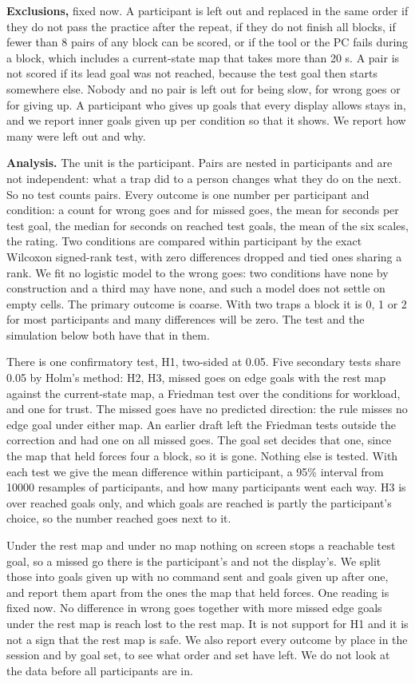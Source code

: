 \documentclass[pdflatex,sn-mathphys-num]{sn-jnl}
\begin{document}
\textbf{Exclusions,} fixed now. A participant is left out and replaced in the same order if they do not pass the
practice after the repeat, if they do not finish all blocks, if fewer than 8 pairs of any block can be scored, or
if the tool or the PC fails during a block, which includes a current-state map that takes more than 20 s. A pair
is not scored if its lead goal was not reached, because the test goal then starts somewhere else. Nobody and no
pair is left out for being slow, for wrong goes or for giving up. A participant who gives up goals that every
display allows stays in, and we report inner goals given up per condition so that it shows. We report how many
were left out and why.

\textbf{Analysis.} The unit is the participant. Pairs are nested in participants and are not independent: what a
trap did to a person changes what they do on the next. So no test counts pairs. Every outcome is one number per
participant and condition: a count for wrong goes and for missed goes, the mean for seconds per test goal, the
median for seconds on reached test goals, the mean of the six scales, the rating. Two conditions are compared
within participant by the exact Wilcoxon signed-rank test, with zero differences dropped and tied ones sharing a
rank. We fit no logistic model to the wrong goes: two conditions have none by construction and a third may have
none, and such a model does not settle on empty cells. The primary outcome is coarse. With two traps a block it
is 0, 1 or 2 for most participants and many differences will be zero. The test and the simulation below both
have that in them.

There is one confirmatory test, H1, two-sided at 0.05. Five secondary tests share 0.05 by Holm's method: H2, H3,
missed goes on edge goals with the rest map against the current-state map, a Friedman test over the conditions
for workload, and one for trust. The missed goes have no predicted direction: the rule misses no edge goal under
either map. An earlier draft left the Friedman tests outside the correction and had one on all missed goes. The
goal set decides that one, since the map that held forces four a block, so it is gone. Nothing else is tested.
With each test we give the mean difference within participant, a 95\% interval from 10000 resamples of
participants, and how many participants went each way. H3 is over reached goals only, and which goals are
reached is partly the participant's choice, so the number reached goes next to it.

Under the rest map and under no map nothing on screen stops a reachable test goal, so a missed go there is the
participant's and not the display's. We split those into goals given up with no command sent and goals given up
after one, and report them apart from the ones the map that held forces. One reading is fixed now. No difference
in wrong goes together with more missed edge goals under the rest map is reach lost to the rest map. It is not
support for H1 and it is not a sign that the rest map is safe. We also report every outcome by place in the
session and by goal set, to see what order and set have left. We do not look at the data before all participants
are in.
\end{document}
